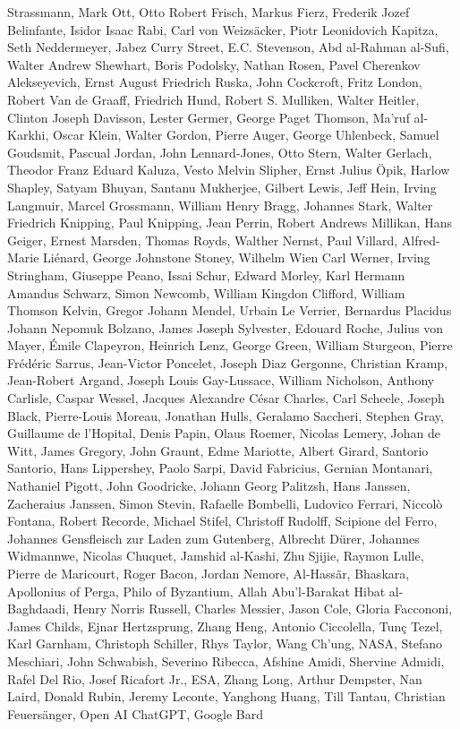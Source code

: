 \begin{spacing}{0.5}
\begin{tiny}
Strassmann, Mark Ott, Otto Robert Frisch, Markus Fierz, Frederik Jozef Belinfante, Isidor Isaac Rabi, Carl von Weizsäcker, Piotr Leonidovich Kapitza, Seth Neddermeyer, Jabez Curry Street, E.C. Stevenson, Abd al-Rahman al-Sufi, Walter Andrew Shewhart, Boris Podolsky, Nathan Rosen, Pavel Cherenkov Alekseyevich, Ernst August Friedrich Ruska, John Cockcroft, Fritz London, Robert Van de Graaff, Friedrich Hund, Robert S. Mulliken, Walter Heitler, Clinton Joseph Davisson, Lester Germer, George Paget Thomson, Ma'ruf al-Karkhi, Oscar Klein, Walter Gordon, Pierre Auger, George Uhlenbeck, Samuel Goudsmit, Pascual Jordan, John Lennard-Jones, Otto Stern, Walter Gerlach, Theodor Franz Eduard Kaluza, Vesto Melvin Slipher, Ernst Julius Öpik, Harlow Shapley, Satyam Bhuyan, Santanu Mukherjee, Gilbert Lewis, Jeff Hein, Irving Langmuir, Marcel Grossmann, William Henry Bragg, Johannes Stark, Walter Friedrich Knipping, Paul Knipping, Jean Perrin, Robert Andrews Millikan, Hans Geiger, Ernest Marsden, Thomas Royds, Walther Nernst, Paul Villard, Alfred-Marie Liénard, George Johnstone Stoney, Wilhelm Wien Carl Werner, Irving Stringham, Giuseppe Peano, Issai Schur, Edward Morley, Karl Hermann Amandus Schwarz, Simon Newcomb, William Kingdon Clifford, William Thomson Kelvin, Gregor Johann Mendel, Urbain Le Verrier, Bernardus Placidus Johann Nepomuk Bolzano, James Joseph Sylvester, Edouard Roche, Julius von Mayer, Émile Clapeyron, Heinrich Lenz, George Green, William Sturgeon, Pierre Frédéric Sarrus, Jean-Victor Poncelet, Joseph Diaz Gergonne, Christian Kramp, Jean-Robert Argand, Joseph Louis Gay-Lussace, William Nicholson, Anthony Carlisle, Caspar Wessel, Jacques Alexandre César Charles, Carl Scheele, Joseph Black, Pierre-Louis Moreau, Jonathan Hulls, Geralamo Saccheri, Stephen Gray, Guillaume de l'Hopital, Denis Papin, Olaus Roemer, Nicolas Lemery, Johan de Witt, James Gregory, John Graunt, Edme Mariotte, Albert Girard, Santorio Santorio, Hans Lippershey, Paolo Sarpi, David Fabricius, Gernian Montanari, Nathaniel Pigott, John Goodricke, Johann Georg Palitzsh, Hans Janssen, Zacheraius Janssen, Simon Stevin, Rafaelle Bombelli, Ludovico Ferrari, Niccolò Fontana, Robert Recorde, Michael Stifel, Christoff Rudolff, Scipione del Ferro, Johannes Gensfleisch zur Laden zum Gutenberg, Albrecht Dürer, Johannes Widmannwe, Nicolas Chuquet, Jamshid al-Kashi, Zhu Sjijie, Raymon Lulle, Pierre de Maricourt, Roger Bacon, Jordan Nemore, Al-Hassãr, Bhaskara, Apollonius of Perga, Philo of Byzantium, Allah Abu'l-Barakat Hibat al-Baghdaadi, Henry Norris Russell, Charles Messier, Jason Cole, Gloria Faccononi, James Childs, Ejnar Hertzsprung, Zhang Heng, Antonio Ciccolella, Tunç Tezel, Karl Garnham, Christoph Schiller, Rhys Taylor, Wang Ch'ung, NASA, Stefano Meschiari, John Schwabish, Severino Ribecca, Afshine Amidi, Shervine Admidi, Rafel Del Rio, Josef Ricafort Jr., ESA, Zhang Long, Arthur Dempster, Nan Laird, Donald Rubin, Jeremy Leconte, Yanghong Huang, Till Tantau, Christian Feuersänger, Open AI ChatGPT, Google Bard
	\end{tiny}
	\end{spacing}
	
